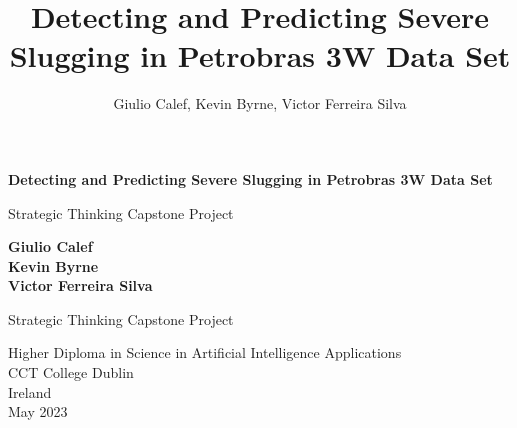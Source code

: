 \documentclass{article}
\begin{document}
\begin{titlepage}
   \begin{center}
       \vspace*{1cm}

       \textbf{Detecting and Predicting Severe Slugging in Petrobras 3W Data Set}

       \vspace{0.5cm}
        Strategic Thinking Capstone Project
            
       \vspace{1.5cm}

       \textbf{Giulio Calef} \\
       \textbf{Kevin Byrne} \\
       \textbf{Victor Ferreira Silva} \\

       \vfill
            
       Strategic Thinking Capstone Project
            
       \vspace{0.8cm}
     
            
       Higher Diploma in Science in Artificial Intelligence Applications\\
       CCT College Dublin\\
       Ireland\\
       May 2023
            
   \end{center}
\end{titlepage}

\title{Detecting and Predicting Severe Slugging in Petrobras 3W Data Set}

\author{Giulio Calef, Kevin Byrne, Victor Ferreira Silva}
\tableofcontents

\maketitle
\end{document}
